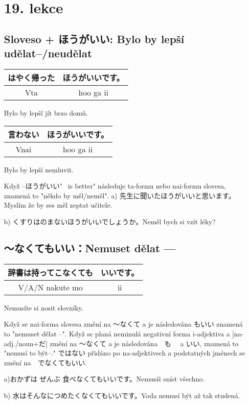 \section{19. lekce}

\subsection{Sloveso + ほうがいい: Bylo by lepší udělat--/neudělat}
\begin{tabular}{|c|c|}
\hline
はやく帰った& ほうがいいです。\\
\hline
Vta&hoo ga ii\\
\hline
\end{tabular}
Bylo by lepší jít brzo domů.


\begin{tabular}{|c|c|}
\hline
言わない&ほうがいいです。\\
\hline
Vnai&hoo ga ii\\
\hline
\end{tabular}
Bylo by lepší nemluvit.


Když  --ほうがいい"~ is better" následuje ta-formu nebo nai-formu slovesa, znamená to "někdo by měl/neměl".
a) 先生に聞いたほうがいいと思います。Myslím že by ses měl zeptat učitele.

b) くすりはのまないほうがいいでしょうか。Neměl bych si vzít léky?



\subsection{〜なくてもいい：Nemuset dělat  ---}
\begin{tabular}{|c|c|}
\hline
辞書は持ってこなくても&いいです。\\
\hline
V/A/N nakute mo&ii\\
\hline
\end{tabular}
Nemusíte si nosit slovníky.

Když se nai-forma slovesa změní na 〜なくて a je následována もいい znamená to "nemuset dělat --". Když se planá neminulá negativní forma i-adjektiva a  [na- adj./noun+だ] změní na 〜なくて a je následována　も　 a いい, znamená to "nemusí to být--." ではない přidáno po na-adjektivech a podstatných jménech se změní na　でなくてもいい.

a)おかずは ぜんぶ 食べなくてもいいです。Nemusíš sníst všechno.


b) 水はそんなにつめたくなくてもいいです。Voda nemusí být až tak studená.

